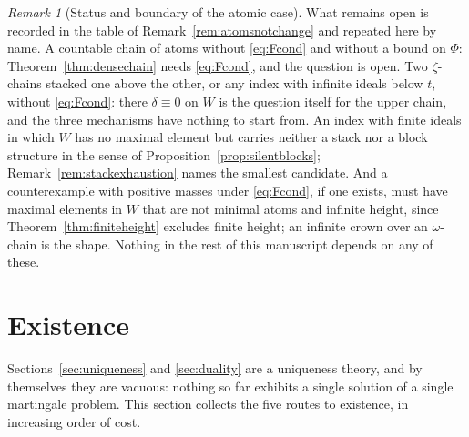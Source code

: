 \documentclass[11pt,a4paper]{article}
\theoremstyle{plain}
\theoremstyle{definition}
\theoremstyle{remark}
\newtheorem{remark}[theorem]{Remark}
\begin{document}
\begin{remark}[Status and boundary of the atomic case]
  What remains open is recorded in the table of
  Remark~\ref{rem:atomsnotchange} and repeated here by name.  A countable
  chain of atoms without \eqref{eq:Fcond} and without a bound on $\Phi$:
  Theorem~\ref{thm:densechain} needs \eqref{eq:Fcond}, and the question is
  open.  Two $\zeta$-chains stacked one above the other, or any index with
  infinite ideals below $t$, without \eqref{eq:Fcond}: there $\delta \equiv 0$
  on $W$ is the question itself for the upper chain, and the three mechanisms
  have nothing to start from.  An index with finite ideals in which $W$ has
  no maximal element but carries neither a stack nor a block structure in the
  sense of Proposition~\ref{prop:silentblocks};
  Remark~\ref{rem:stackexhaustion} names the smallest candidate.  And a
  counterexample with positive masses under \eqref{eq:Fcond}, if one exists,
  must have maximal elements in $W$ that are not minimal atoms and infinite
  height, since Theorem~\ref{thm:finiteheight} excludes finite height; an
  infinite crown over an $\omega$-chain is the shape.  Nothing in the rest of
  this manuscript depends on any of these.
\end{remark}

\section{Existence}
\label{sec:convergence}

Sections~\ref{sec:uniqueness} and \ref{sec:duality} are a uniqueness theory, and
by themselves they are vacuous: nothing so far exhibits a single solution of a
single martingale problem.  This section collects the five routes to existence,
in increasing order of cost.
\end{document}
